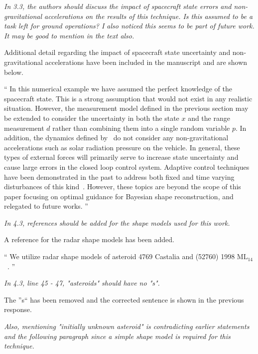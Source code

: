 \documentclass[11pt]{article}
\newenvironment{correction}{\begin{list}{}{\setlength{\leftmargin}{1cm}\setlength{\rightmargin}{1cm}}\vspace{\parsep}\item[]``}{''\end{list}}
\newcommand{\comment}[1]{\item \itshape #1 \normalfont}
\begin{document}
\begin{itemize}
\comment{
In 3.3, the authors should discuss the impact of spacecraft state errors and non-gravitational accelerations on the results of this technique. 
Is this assumed to be a task left for ground operations?
I also noticed this seems to be part of future work. It may be good to mention in the text also.
}

Additional detail regarding the impact of spacecraft state uncertainty and non-gravitational accelerations have been included in the manuscript and are shown below.


\begin{correction}
    In this numerical example we have assumed the perfect knowledge of the spacecraft state. 
    This is a strong assumption that would not exist in any realistic situation. 
    However, the measurement model defined in the previous section may be extended to consider the uncertainty in both the state \( x \) and the range measurement \( d \) rather than combining them into a single random variable \( p \).
    In addition, the dynamics defined by~ do not consider any non-gravitational accelerations such as solar radiation pressure on the vehicle.
    In general, these types of external forces will primarily serve to increase state uncertainty and cause large errors in the closed loop control system.
    Adaptive control techniques have been demonstrated in the past to address both fixed and time varying disturbances of this kind~\cite{kulumani2017a}.
    However, these topics are beyond the scope of this paper focusing on optimal guidance for Bayesian shape reconstruction, and relegated to future works. 
\end{correction}

\comment{
In 4.3, references should be added for the shape models used for this work.}

A reference for the radar shape models has been added.


\begin{correction}
We utilize radar shape models of asteroid \num{4769} Castalia and (\num{52760}) \num{1998} \(\text{ML}_{14}\)~\cite{neese2004}.
\end{correction}

\comment{
In 4.3, line 45 - 47, "asteroids" should have no "s". 
}

The ''s`` has been removed and the corrected sentence is shown in the previous response.


\comment{
Also, mentioning "initially unknown asteroid" is contradicting earlier statements and the following paragraph since a simple shape model is required for this technique.
}


\end{itemize}
\end{document}
